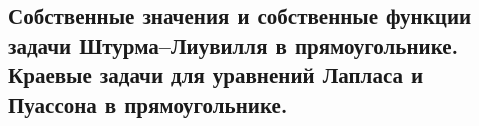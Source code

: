 \subsection{Собственные значения и собственные функции задачи Штурма–Лиувилля в прямоугольнике. Краевые задачи для уравнений Лапласа и Пуассона в прямоугольнике.}